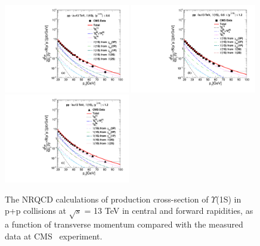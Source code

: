 \documentclass[review]{elsarticle}
\begin{document}
\begin{figure}
  \centering
  \includegraphics[width=0.49\textwidth]{Figures/NRQCD_Beauty/Fig8a_CMS_D2NDPtDy_Y1S_13TeV_Y0006_Pt.pdf}
  \includegraphics[width=0.49\textwidth]{Figures/NRQCD_Beauty/Fig8b_CMS_D2NDPtDy_Y1S_13TeV_Y0612_Pt.pdf} 
  \includegraphics[width=0.49\textwidth]{Figures/NRQCD_Beauty/Fig8c_CMS_D2NDPtDy_Y1S_13TeV_Y0012_Pt.pdf}
  \caption{\small{The NRQCD calculations of production cross-section of $\Upsilon$(1S) in p+p collisions at 
      $\sqrt{s}$ = 13 TeV in central and forward rapidities, as a function of transverse momentum compared with the measured data 
      at CMS~\cite{Sirunyan:2017qdw} experiment. }}
  \label{Fig:SigmaY1SCMS13TeV}
\end{figure}
\end{document}
